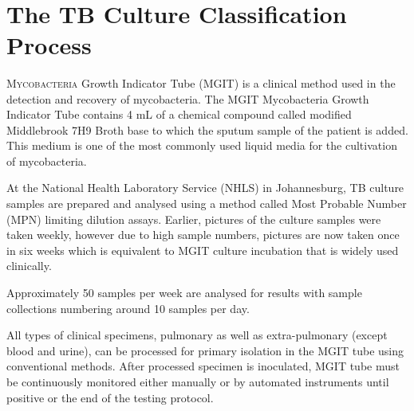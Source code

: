 \documentclass[a4paper,twoside,12pt]{report}
\begin{document}
{}

\setlength{\nomlabelwidth}{2cm}

%
%


%
%
%


\printnomenclature

\newpage 
~\thispagestyle{empty}\newpage
{}

\chapter {The TB Culture Classification Process}
\lettrine{M}{ycobacteria} Growth Indicator Tube (MGIT) is a clinical method used in the detection and recovery of mycobacteria. The MGIT Mycobacteria Growth Indicator Tube contains 4 mL of a chemical compound called modified Middlebrook 7H9 Broth base to which the sputum sample of the patient is added. This medium is one of the most commonly used liquid media for the cultivation of mycobacteria.

At the National Health Laboratory Service (NHLS) in Johannesburg, TB culture samples are prepared and analysed using a method called Most Probable Number (MPN) limiting dilution assays.   Earlier, pictures of the culture samples were taken weekly, however due to high sample numbers, pictures are now taken once in six weeks which is equivalent to MGIT culture incubation that is widely used clinically.      

Approximately 50 samples per week are analysed for results with sample collections numbering around 10 samples per day.

All types of clinical specimens, pulmonary as well as extra-pulmonary (except blood and urine), can be processed for primary isolation in the MGIT tube using conventional methods. After processed specimen is inoculated, MGIT tube must be continuously monitored either manually or by automated instruments until positive or the end of the testing protocol.
\end{document}
